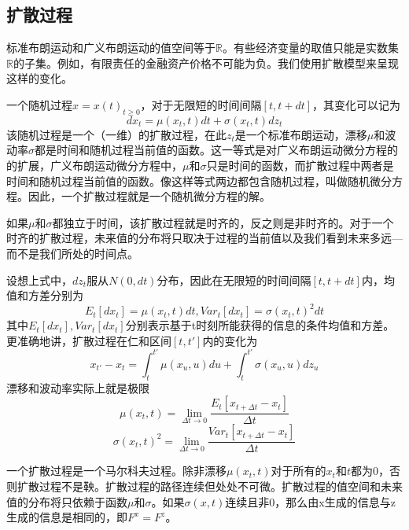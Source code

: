 \documentclass[UTF8]{ctexart}
\begin{document}
\subsection{扩散过程}

标准布朗运动和广义布朗运动的值空间等于$\mathbb{R}$。有些经济变量的取值只能是实数集$\mathbb{R}$的子集。例如，有限责任的金融资产价格不可能为负。我们使用扩散模型来呈现这样的变化。

一个随机过程$x=x(t)_{t \geqslant 0}$，对于无限短的时间间隔$[t,t+dt]$，其变化可以记为
$$dx_t=\mu(x_t,t)dt+\sigma(x_t,t)dz_t$$
该随机过程是一个（一维）的扩散过程，在此$z_t$是一个标准布朗运动，漂移$\mu$和波动率$\sigma$都是时间和随机过程当前值的函数。这一等式是对广义布朗运动微分方程的的扩展，广义布朗运动微分方程中，$\mu$和$\sigma$只是时间的函数，而扩散过程中两者是时间和随机过程当前值的函数。像这样等式两边都包含随机过程，叫做随机微分方程。因此，一个扩散过程就是一个随机微分方程的解。

如果$\mu$和$\sigma$都独立于时间，该扩散过程就是时齐的，反之则是非时齐的。对于一个时齐的扩散过程，未来值的分布将只取决于过程的当前值以及我们看到未来多远---而不是我们所处的时间点。

设想上式中，$dz_t$服从$N(0,dt)$分布，因此在无限短的时间间隔$[t,t+dt]$内，均值和方差分别为
$$E_t[dx_t]=\mu(x_t,t)dt,Var_t[dx_t]=\sigma(x_t,t)^2dt$$
其中$E_t[dx_t],Var_t[dx_t]$分别表示基于t时刻所能获得的信息的条件均值和方差。更准确地讲，扩散过程在仁和区间$[t,t']$内的变化为
$$x_{t'}-x_t=\int_t^{t'}\mu(x_u,u)du+\int_t^{t'}\sigma(x_u,u)dz_u$$
漂移和波动率实际上就是极限
$$\mu(x_t,t)=\lim\limits_{\Delta t \rightarrow 0} \frac{E_t[x_{t+\Delta t}-x_t]}{\Delta t}$$
$$\sigma(x_t,t)^2=\lim\limits_{\Delta t \rightarrow 0} \frac{Var_t[x_{t+\Delta t}-x_t]}{\Delta t}$$

一个扩散过程是一个马尔科夫过程。除非漂移$\mu(x_t,t)$对于所有的$x_t$和$t$都为0，否则扩散过程不是鞅。扩散过程的路径连续但处处不可微。扩散过程的值空间和未来值的分布将只依赖于函数$\mu$和$\sigma$。如果$\sigma(x,t)$连续且非0，那么由x生成的信息与z生成的信息是相同的，即$F^x=F^z$。
\end{document}
